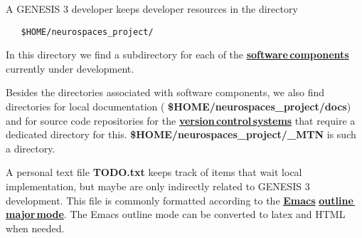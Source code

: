 \documentclass[12pt]{article}
\begin{document}
A GENESIS 3 developer keeps developer resources in the directory

\begin{verbatim}
   $HOME/neurospaces_project/
\end{verbatim}

In this directory we find a subdirectory for each of the
\href{../genesis-components/genesis-components.tex}{\bf software\,components} currently under development.

Besides the directories associated with software components, we also
find directories for local documentation ({\bf
  \$HOME/neurospaces\_project/docs}) and for source code repositories
for the \href{../version-control/version-control.tex}{\bf version\,control\,systems} 
that require a dedicated directory for this.  {\bf
  \$HOME/neurospaces\_project/\_MTN} is such a directory.

A personal text file {\bf TODO.txt} keeps track of items that wait
local implementation, but maybe are only indirectly related to GENESIS
3 development.  This file is commonly formatted according to the
\href{http://www.gnu.org/software/emacs/}{\bf Emacs}
\href{http://www.emacswiki.org/emacs/OutlineMode}{\bf outline\,major\,mode}.
The Emacs outline mode can be converted to latex and HTML when needed.
\end{document}
